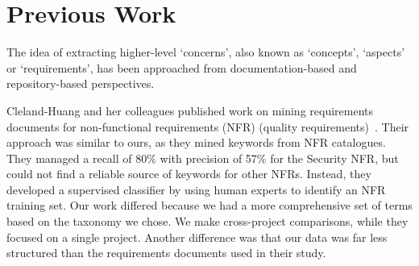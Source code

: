 \documentclass[]{sig-alternate}
\begin{document}



\section{Previous Work}
\label{sec:related}

The idea of extracting higher-level `concerns', also known as `concepts', `aspects' or `requirements', has been approached from documentation-based and repository-based perspectives.

Cleland-Huang and her colleagues published work on mining requirements documents for non-functional requirements (NFR) (quality requirements)~\cite{Cleland-Huang2006}. 
Their approach was similar to ours, as they mined keywords from NFR catalogues.
They managed a recall of 80\% with precision of 57\% for the Security NFR, but could not find a reliable source of keywords for other NFRs. 
Instead, they developed a supervised classifier by using human experts to identify an NFR training set. 
Our work differed because we had a more comprehensive set of terms based on the taxonomy we chose.
We make cross-project comparisons, while they focused on a single project.
Another difference was that our data was far less structured than the requirements documents used in their study.
\end{document}
